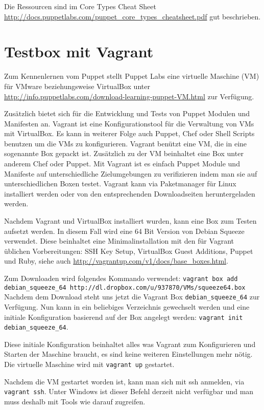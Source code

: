 \documentclass[12pt,a4paper,ngerman]{article}
\begin{document}
Die Ressourcen sind im Core Types Cheat Sheet \url{http://docs.puppetlabs.com/puppet_core_types_cheatsheet.pdf} gut beschrieben.

\section{Testbox mit Vagrant}
Zum Kennenlernen vom Puppet stellt Puppet Labs eine virtuelle Maschine (VM) für VMware beziehungsweise VirtualBox unter \url{http://info.puppetlabs.com/download-learning-puppet-VM.html} zur Verfügung. 

Zusätzlich bietet sich für die Entwicklung und Tests von Puppet Modulen und Manifesten \cite{vagrant} an. Vagrant ist eine Konfigurationstool für die Verwaltung von VMs mit VirtualBox. Es kann in weiterer Folge auch Puppet, Chef oder Shell Scripts benutzen um die VMs zu konfigurieren. Vagrant benützt eine VM, die in eine sogenannte Box gepackt ist. Zusätzlich zu der VM beinhaltet eine Box unter anderem Chef oder Puppet. Mit Vagrant ist es einfach Puppet Module und Manifeste auf unterschiedliche Zielumgebungen zu verifizieren indem man sie auf unterschiedlichen Boxen testet. Vagrant kann via Paketmanager für Linux installiert werden oder von den entsprechenden Downloadseiten heruntergeladen werden.

Nachdem Vagrant und VirtualBox installiert wurden, kann eine Box zum Testen aufsetzt werden. In diesem Fall wird eine 64 Bit Version von Debian Squeeze verwendet. Diese beinhaltet eine Minimalinstallation mit den für Vagrant üblichen Vorbereitungen: SSH Key Setup, VirtualBox Guest Additions, Puppet und Ruby, siehe auch \url{http://vagrantup.com/v1/docs/base_boxes.html}.

Zum Downloaden wird folgendes Kommando verwendet: \lstinline[language=bash]$vagrant box add debian_squeeze_64 http://dl.dropbox.com/u/937870/VMs/squeeze64.box$
Nachdem dem Download steht uns jetzt die  Vagrant Box \lstinline$debian_squeeze_64$ zur Verfügung. Nun kann in ein beliebiges Verzeichnis gewechselt werden und eine initiale Konfiguration basierend auf der Box angelegt werden: \lstinline[language=bash]$vagrant init debian_squeeze_64$.


Diese initiale Konfiguration beinhaltet alles was Vagrant zum Konfigurieren und Starten der Maschine braucht, es sind keine weiteren Einstellungen mehr nötig. Die virtuelle Maschine  wird mit \lstinline[language=bash]$vagrant up$ gestartet.

Nachdem die VM gestartet worden ist, kann man sich mit ssh anmelden, via \lstinline[language=bash]$vagrant ssh$. Unter Windows ist dieser Befehl derzeit nicht verfügbar und man muss deshalb mit Tools wie \cite{putty} darauf zugreifen.
\end{document}
